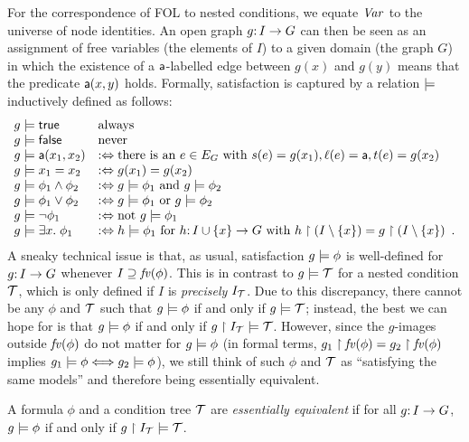 For the correspondence of FOL to nested conditions, we equate $\mathit{Var}$ to the universe of node identities. An open graph $g{:}\, I\rightarrow G$ can then be seen as an assignment of free variables (the elements of $I$) to a given domain (the graph $G$) in which the existence of a $\mathsf{a}$-labelled edge between $g(x)$ and $g(y)$ means that the predicate $\mathsf{a}(x,y)$ holds. Formally, satisfaction is captured by a relation $\models$ inductively defined as follows:
%
\[\begin{array}{ll}
g\models \mathsf{true} & \text{always} \\
g\models \mathsf{false} & \text{never} \\
g\models \mathsf{a}(x_1,x_2) & :\Leftrightarrow \text{there is an } e\in E_G \text{ with } s(e)=g(x_1), \ell(e)=\mathsf{a}, t(e)=g(x_2) \\
g\models x_1=x_2 & :\Leftrightarrow g(x_1)=g(x_2) \\
g\models \phi_1\wedge \phi_2 & :\Leftrightarrow g\models \phi_1 \text{ and } g\models \phi_2 \\
g\models \phi_1\vee \phi_2 & :\Leftrightarrow g\models \phi_1 \text{ or } g\models \phi_2 \\
g\models \neg\phi_1 & :\Leftrightarrow \text{not } g\models \phi_1 \\
g\models \exists x.\; \phi_1  & :\Leftrightarrow h\models \phi_1 \text{ for } h{:}\, I\cup\{{x}\}\rightarrow G \text{ with } h\restriction (I\setminus \{{x}\}) =g\restriction (I\setminus \{{x}\}) \enspace.
\end{array}\]
%
A sneaky technical issue is that, as usual, satisfaction $g\models\phi$ is well-defined for $g{:}\, I\rightarrow G$ whenever $I\supseteq\mathit{fv}(\phi)$. This is in contrast to $g\models{\mathcal{T}}$ for a nested condition ${\mathcal{T}}$, which is only defined if $I$ is \emph{precisely} $I_{\mathcal{T}}$. Due to this discrepancy, there cannot be any $\phi$ and ${\mathcal{T}}$ such that $g\models \phi$ if and only if $g\models {\mathcal{T}}$; instead, the best we can hope for is that $g\models \phi$ if and only if $g\restriction I_{\mathcal{T}} \models {\mathcal{T}}$. However, since the $g$-images outside $\mathit{fv}(\phi)$ do not matter for $g\models \phi$ (in formal terms, $g_1\restriction \mathit{fv}(\phi)=g_2\restriction \mathit{fv}(\phi)$ implies $g_1\models\phi \Longleftrightarrow g_2\models\phi$), we still think of such $\phi$ and ${\mathcal{T}}$ as ``satisfying the same models'' and therefore being essentially equivalent.

\begin{definition}\label{def:essential equivalence}
A formula $\phi$ and a condition tree ${\mathcal{T}}$ are \emph{essentially equivalent} if for all $g{:}\, I\rightarrow G$, $g\models \phi$ if and only if $g\restriction I_{\mathcal{T}}\models {\mathcal{T}}$.
\end{definition}

